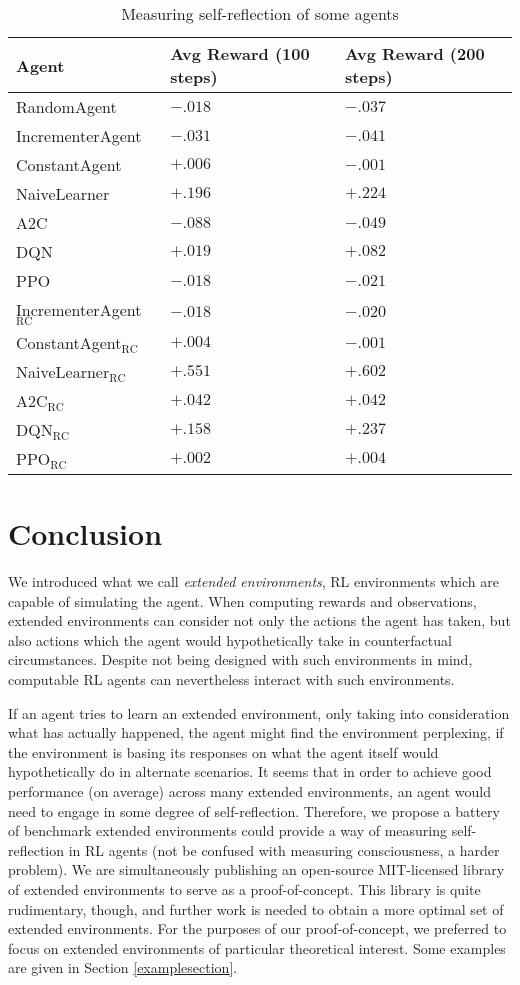 \documentclass{article}
\def\RC{\textrm{RC}}
\begin{document}
\begin{table}
  \caption{Measuring self-reflection of some agents}
  \label{measurementtable}
  \centering
  \begin{tabular}{lll}
    \toprule
    Agent     & Avg Reward (100 steps)     & Avg Reward (200 steps)\\
    \midrule
    RandomAgent & $-.018$ & $-.037$\\
    IncrementerAgent & $-.031$ & $-.041$\\
    ConstantAgent & $+.006$ & $-.001$\\
    NaiveLearner & $+.196$ & $+.224$\\
    A2C & $-.088$ & $-.049$\\
    DQN & $+.019$ & $+.082$\\
    PPO & $-.018$ & $-.021$\\
    IncrementerAgent${}_{\RC}$ & $-.018$ & $-.020$\\
    ConstantAgent${}_{\RC}$ & $+.004$ & $-.001$\\
    NaiveLearner${}_{\RC}$ & $+.551$ & $+.602$\\
    A2C${}_{\RC}$ & $+.042$ & $+.042$\\
    DQN${}_{\RC}$ & $+.158$ & $+.237$\\
    PPO${}_{\RC}$ & $+.002$ & $+.004$\\
    \bottomrule
  \end{tabular}
\end{table}

\section{Conclusion}

We introduced what we call \emph{extended environments}, RL environments
which are capable of simulating the agent. When computing rewards and observations,
extended environments can consider not only the actions the agent has taken, but also
actions which the agent would hypothetically take in counterfactual circumstances.
Despite not being designed with such environments in mind, computable RL agents
can nevertheless interact with such environments.

If an agent tries to learn an extended environment, only taking into consideration
what has actually happened, the agent might find the environment perplexing, if the
environment is basing its responses on what the agent itself would hypothetically
do in alternate scenarios. It seems that in order to achieve good performance (on
average) across many extended environments, an agent would need to engage in some degree of
self-reflection. Therefore, we propose a battery of benchmark extended environments
could provide a way of measuring self-reflection in RL agents (not be confused
with measuring consciousness, a harder problem). We are simultaneously publishing
an open-source MIT-licensed library \cite{library} of extended environments to serve
as a proof-of-concept. This library is quite rudimentary, though, and further work is
needed to obtain a more optimal set of extended environments. For the purposes of our
proof-of-concept, we preferred to focus on extended environments of particular
theoretical interest. Some examples are given in Section \ref{examplesection}.
\end{document}
